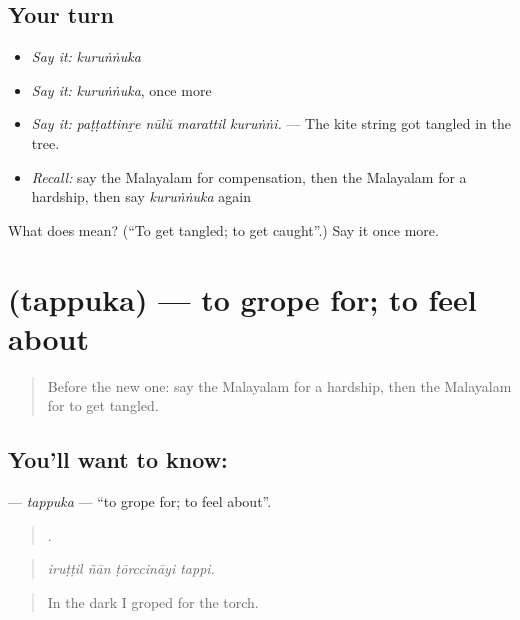 \subsection*{Your turn}
\begin{itemize}
\raggedright
  \item \emph{Say it:} \emph{kuruṅṅuka}
  \item \emph{Say it:} \emph{kuruṅṅuka}, once more
  \item \emph{Say it:} \emph{paṭṭattinṟe nūlŭ marattil kuruṅṅi.} — The kite string got tangled in the tree.
  \item \emph{Recall:} say the Malayalam for compensation, then the Malayalam for a hardship, then say \emph{kuruṅṅuka} again
\end{itemize}

\begin{tcolorbox}[breakable,colback=teal!4,colframe=teal!35!black,title={Before you move on}]
What does  mean? (\textquotedblleft{}To get tangled; to get caught\textquotedblright{}.) Say it once more.
\end{tcolorbox}
\section[\texorpdfstring{\ml{തപ്പുക} (tappuka)}{തപ്പുക (tappuka)}]{ (tappuka) — to grope for; to feel about}

\label{lesson:ML-C515-tappuka}



\begin{quote}
Before the new one: say the Malayalam for a hardship, then the Malayalam for to get tangled.
\end{quote}

\subsection*{You'll want to know: }
\textbf{} — \emph{tappuka} — \textquotedblleft{}to grope for; to feel about\textquotedblright{}.

\begin{quote}
   .
\end{quote}

\begin{quote}
\emph{iruṭṭil ñān ṭōrccināyi tappi.}
\end{quote}

\begin{quote}
In the dark I groped for the torch.
\end{quote}

